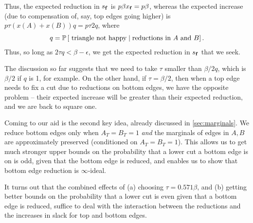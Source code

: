 Thus, the expected reduction in $s_\bbf$ is $p\beta x_\bbf = p\beta$, whereas the expected increase (due to compensation of, say, top edges going higher) is $p\tau (x(A) + x(B))q = p \tau 2 q$,
where $$q = \P{\text{ triangle not happy} \mid \text{reductions in $A$ and $B$}}.$$ Thus, so long as $2 \tau q < \beta - \epsilon$, we get the expected reduction in $s_\bbf$ that we seek.

The discussion so far suggests that we need to take $\tau$ smaller than $\beta/2q$, which is $\beta/2$ if $q$ is 1, for example. On the other hand, if $\tau = \beta/2$, then when a top edge needs to fix a cut due to reductions on bottom edges, we have the opposite problem -- their expected increase will be greater than their expected reduction, and we are back to square one.

Coming to our aid is the second key idea, already discussed in \cref{sec:marginals}.  We reduce bottom edges only when $A_T = B_T = 1$ {\em and} the marginals of edges in $A,B$ are approximately preserved (conditioned on $A_T = B_T = 1$). This allows us to get much stronger upper bounds on the probability that a lower cut a bottom edge is on is odd, given that the bottom edge is reduced, and enables us to show that bottom edge reduction is $\infty$-ideal.

It turns out that the combined effects of (a) choosing $\tau =0.571 \beta$, and (b) getting better bounds on the probability that a lower cut is even given that a bottom edge is reduced, suffice to deal with the interaction between the reductions and the increases in slack for top and bottom edges.


